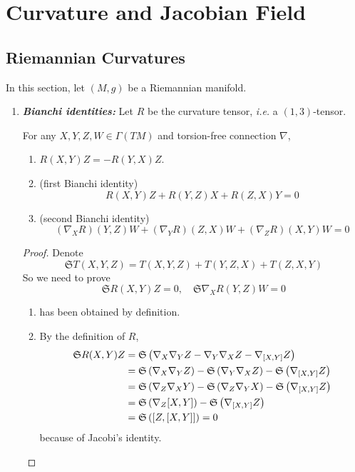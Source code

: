 \chapter{Curvature and Jacobian Field}

\section{Riemannian Curvatures}
In this section, let $(M,g)$ be a Riemannian manifold.

\begin{enumerate}[label=\arabic{*}.]
	\item \emph{\textbf{Bianchi identities:}} Let $R$ be the curvature tensor, \emph{i.e.} a $(1,3)$-tensor.
	\begin{prop}
		For any $X,Y,Z,W \in \Gamma(TM)$ and torsion-free connection $\nabla$,
		\begin{enumerate}[label=(\arabic{*})]
			\item $R(X,Y)Z = -R(Y,X)Z$.
			\item (first Bianchi identity)
			\begin{equation*}
				R(X,Y)Z + R(Y,Z)X + R(Z,X)Y = 0
			\end{equation*}
			\item (second Bianchi identity)
			\begin{equation*}
				(\nabla_XR)(Y,Z)W+(\nabla_YR)(Z,X)W+(\nabla_ZR)(X,Y)W = 0
			\end{equation*}
		\end{enumerate}
	\end{prop}
	\begin{proof}
		Denote
		\begin{equation*}
			\mathfrak{S}T(X,Y,Z) = T(X,Y,Z) + T(Y,Z,X) + T(Z,X,Y)
		\end{equation*}
		So we need to prove
		\begin{equation*}
			\mathfrak{S}R(X,Y)Z = 0,\quad \mathfrak{S}\nabla_XR(Y,Z)W = 0
		\end{equation*}
		\begin{enumerate}[label=(\arabic{*})]
			\item has been obtained by definition.

			\item By the definition of $R$,
			\begin{equation*}
				\begin{aligned}
					\mathfrak{S}R(X,Y)Z &= \mathfrak{S}\left(\nabla_X\nabla_YZ - \nabla_Y\nabla_XZ -\nabla_{[X,Y]}Z\right) \\
					&= \mathfrak{S}\left(\nabla_X\nabla_YZ\right) - \mathfrak{S}\left(\nabla_Y\nabla_XZ\right) -\mathfrak{S}\left(\nabla_{[X,Y]}Z\right) \\
					&= \mathfrak{S}\left(\nabla_Z\nabla_XY\right) - \mathfrak{S}\left(\nabla_Z\nabla_YX\right) -\mathfrak{S}\left(\nabla_{[X,Y]}Z\right) \\
					&= \mathfrak{S}\left(\nabla_Z[X,Y]\right)-\mathfrak{S}\left(\nabla_{[X,Y]}Z\right) \\
					&= \mathfrak{S}\left([Z,[X,Y]]\right) = 0
				\end{aligned}
			\end{equation*}
			because of Jacobi's identity.


\end{enumerate}
\end{proof}
\end{enumerate}
